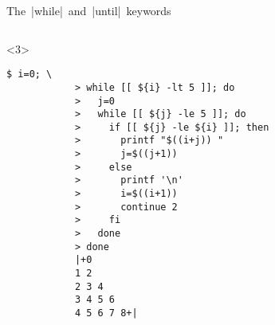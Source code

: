 \begin{frame}[fragile]{The \,\bash|while|\, and \,\bash|until|\, keywords}
\begin{onlyenv}
\begin{lstlisting}[style=MyBash]
        \end{lstlisting}
    \end{onlyenv}
    \begin{onlyenv}<3>
        \begin{lstlisting}[style=MyBash]
            $ i=0; \
            > while [[ ${i} -lt 5 ]]; do
            >   j=0
            >   while [[ ${j} -le 5 ]]; do
            >     if [[ ${j} -le ${i} ]]; then
            >       printf "$((i+j)) "
            >       j=$((j+1))
            >     else
            >       printf '\n'
            >       i=$((i+1))
            >       continue 2
            >     fi
            >   done
            > done
            |+0
            1 2
            2 3 4
            3 4 5 6
            4 5 6 7 8+|
        \end{lstlisting}
    \end{onlyenv}
\end{frame}
